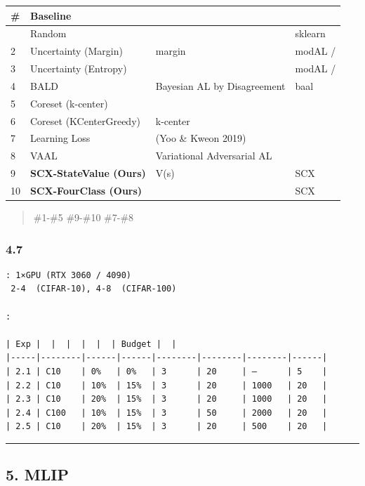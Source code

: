 \documentclass[
  12pt,
]{article}
\begin{document}
\begin{longtable}[]{@{}llll@{}}
\toprule\noalign{}
\# & Baseline &  &  \\
\midrule\noalign{}
\endhead
\bottomrule\noalign{}
\endlastfoot
1 & Random &  & sklearn \\
2 & Uncertainty (Margin) &  margin & modAL /  \\
3 & Uncertainty (Entropy) &  & modAL /  \\
4 & BALD & Bayesian AL by Disagreement & baal \\
5 & Coreset (k-center) &  &  \\
6 & Coreset (KCenterGreedy) &  k-center &  \\
7 & Learning Loss &  (Yoo \& Kweon 2019) &  \\
8 & VAAL & Variational Adversarial AL &  \\
9 & \textbf{SCX-StateValue (Ours)} & V(s)  & SCX \\
10 & \textbf{SCX-FourClass (Ours)} &  & SCX \\
\end{longtable}

\begin{quote}
 \#1-\#5  \#9-\#10
 \#7-\#8
\end{quote}

\subsubsection{4.7 }\label{ux5b9eux9a8cux914dux7f6eux8868}

\begin{verbatim}
: 1×GPU (RTX 3060 / 4090)
 2-4  (CIFAR-10), 4-8  (CIFAR-100)

:

| Exp |  |  |  |  |  | Budget |  |
|-----|--------|------|------|--------|--------|--------|------|
| 2.1 | C10    | 0%   | 0%   | 3      | 20     | —      | 5    |
| 2.2 | C10    | 10%  | 15%  | 3      | 20     | 1000   | 20   |
| 2.3 | C10    | 20%  | 15%  | 3      | 20     | 1000   | 20   |
| 2.4 | C100   | 10%  | 15%  | 3      | 50     | 2000   | 20   |
| 2.5 | C10    | 20%  | 15%  | 3      | 20     | 500    | 20   |
\end{verbatim}

\begin{center}\rule{0.5\linewidth}{0.5pt}\end{center}

\subsection{5. MLIP
}\label{mlip-ux6848ux4f8bux5b9eux9a8cux8bbeux8ba1ux65b9ux6848}
\end{document}
